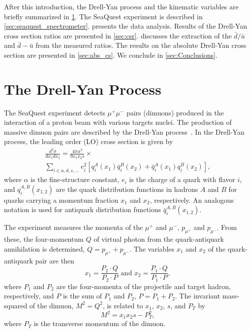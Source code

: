 \documentclass[reprint,aps,unsortedaddress,superscriptaddress,prc,floatfix,showpacs,linenumbers]{revtex4-2}
\begin{document}
After this introduction, the Drell-Yan process and the kinematic variables are briefly summarized in \cref{sec:drell-yan}.
The SeaQuest experiment is described in \cref{sec:seaquest_spectrometer}.
 presents the data analysis.
Results of the Drell-Yan cross section ratios are presented in \cref{sec:csr}.
 discusses the extraction of the $\bar{d}/\bar{u}$ and $\bar{d}-\bar{u}$
from the measured ratios.
The results on the absolute Drell-Yan cross section are presented in \cref{sec:abs_cs}.
We conclude in \cref{sec:Conclusions}.

\section{The Drell-Yan Process}
\label{sec:drell-yan}
The SeaQuest experiment detects $\mu^+\mu^-$ pairs (dimuons) produced in the interaction of a proton
beam with various targets nuclei. The production of massive dimuon pairs are described by the Drell-Yan
process~\cite{drell1970}. In the Drell-Yan process, the leading order (LO) cross section is given by
\begin{multline}
	\frac{d^2\sigma}{dx_1dx_2}=\frac{4\pi \alpha^2}{9x_1x_2s} \times
	\label{eq:DYCross} \\
	\sum_{i\in u,d,s,\dots} e_i^2 \left[q_i^A\left(x_1\right) \bar q_i^B\left(x_2\right) + \bar q_i^A\left(x_1\right)
		q_i^B\left(x_2\right)\right],
\end{multline}
where $\alpha$ is the fine-structure constant, $e_i$ is the charge of a quark with flavor $i$,
and $q_i^{A,B}\left(x_{1,2}\right)$ are the quark distribution functions in hadrons $A$ and $B$
for quarks carrying a momentum fraction $x_1$ and $x_2$, respectively.
An analogous notation is used for antiquark distribution functions $\bar q_i^{A,B}\left(x_{1,2}\right)$.

The experiment measures the momenta of the $\mu^+$ and $\mu^-$, $p_{\mu^+}$ and $p_{\mu^-}$.
From these, the four-momentum $Q$ of virtual photon from the quark-antiquark annihilation is determined,
$Q = p_{\mu^+} + p_{\mu^-}$.
The variables $x_1$ and $x_2$ of the quark-antiquark pair are then
\begin{equation}
	x_1 = \frac{P_2 \cdot Q}{P_2 \cdot P} \text{ and } x_2 =
	\frac{P_1 \cdot Q}{P_1 \cdot P},
	\label{def_x1x2}
\end{equation}
where $P_1$ and $P_2$ are the four-momenta of the projectile and target hadron,
respectively, and $P$ is the sum of $P_1$ and $P_2$, $P=P_1+P_2$.
The invariant mass-squared of the dimuon, $M^2 = Q^2$, is related to $x_1$, $x_2$, $s$, and $P_T$ by
\begin{equation}
	M^2=x_1 x_2 s - P_T^2,
	\label{def_mass}
\end{equation}
where $P_T$ is the transverse momentum of the dimuon.
\end{document}
